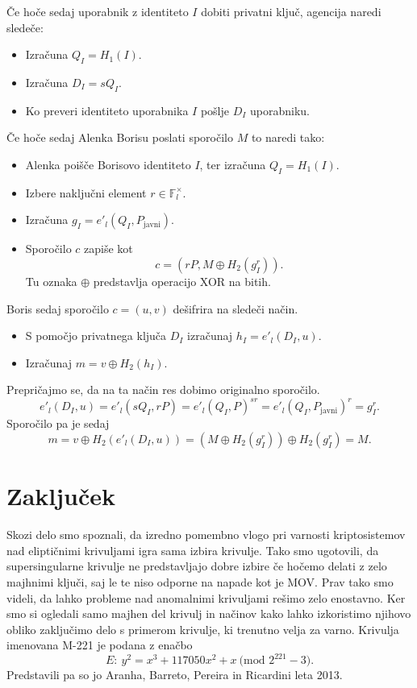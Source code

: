 \documentclass[12pt,a4paper,twoside]{article}
\theoremstyle{definition} %
\theoremstyle{plain} %
\numberwithin{equation}{section}  %
\newcommand{\F}{\mathbb F}
\newcommand{\MOD}[1]{\ \text{(mod }{#1}\text{)}}
\begin{document}
Če hoče sedaj uporabnik z identiteto $I$ dobiti privatni ključ, agencija naredi sledeče:

\begin{itemize}
\item Izračuna $Q_I = H_1(I)$.
\item Izračuna $D_I = sQ_I$.
\item Ko preveri identiteto uporabnika $I$ pošlje $D_I$ uporabniku.
\end{itemize}

Če hoče sedaj Alenka Borisu poslati sporočilo $M$ to naredi tako:

\begin{itemize}
\item Alenka poišče Borisovo identiteto $I$, ter izračuna $Q_I = H_1(I)$.
\item Izbere naključni element $r \in \F^{\times}_l$.
\item Izračuna $g_I = e'_l(Q_I,P_{\text{javni}})$.
\item Sporočilo $c$ zapiše kot
$$c = (rP,M \oplus H_2(g^r_I)).$$
Tu oznaka $\oplus$ predstavlja operacijo XOR na bitih.
\end{itemize}

Boris sedaj sporočilo $c = (u,v)$ dešifrira na sledeči način.
\begin{itemize}
\item S pomočjo privatnega ključa $D_I$ izračunaj $h_I = e'_l(D_I,u)$.
\item Izračunaj $m= v \oplus H_2(h_I)$.
\end{itemize}

Prepričajmo se, da na ta način res dobimo originalno sporočilo.
$$e'_l(D_I,u) = e'_l(sQ_I,rP) = e'_l(Q_I,P)^{sr}= e'_l(Q_I,P_{\text{javni}})^r = g^r_I.$$
Sporočilo pa je sedaj
$$m = v \oplus H_2(e'_l(D_I,u)) = (M \oplus H_2(g^r_I)) \oplus H_2(g^r_I) = M.$$

\section{Zaključek}

Skozi delo smo spoznali, da izredno pomembno vlogo pri varnosti kriptosistemov nad eliptičnimi krivuljami igra sama izbira krivulje. Tako smo ugotovili, da supersingularne krivulje ne predstavljajo dobre izbire če hočemo delati z zelo majhnimi ključi, saj le te niso odporne na napade kot je MOV. Prav tako smo videli, da lahko probleme nad anomalnimi krivuljami rešimo zelo enostavno. Ker smo si ogledali samo majhen del krivulj in načinov kako lahko izkoristimo njihovo obliko zaključimo delo s primerom krivulje, ki trenutno velja za varno. Krivulja imenovana M-221 je podana z enačbo
$$E:\ y^2 = x^3+117050x^2+x \MOD{2^{221} - 3}.$$
Predstavili pa so jo Aranha, Barreto, Pereira in  Ricardini leta 2013.
\end{document}
